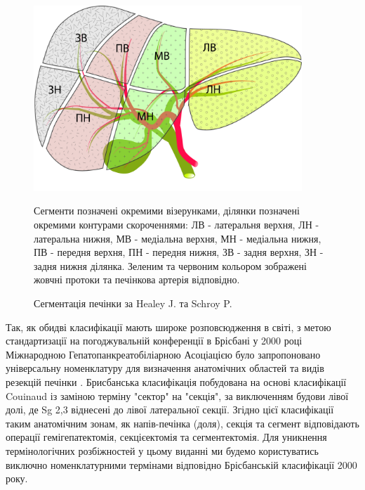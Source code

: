 \begin{figure}[h]
\caption{Сегментація печінки за Healey J. та Schroy P.}

\includegraphics[width=0.9\textwidth]{Illustrations/Chapter_01/Healey.jpg}
\label{fig:Healey}

\medskip
\small
Сегменти позначені окремими візерунками, ділянки позначені окремими контурами скороченнями: ЛВ - латеральня верхня, ЛН - латеральна нижня, МВ - медіальна верхня, МН - медіальна нижня, ПВ - передня верхня, ПН - передня нижня, ЗВ - задня верхня, ЗН - задня нижня ділянка. Зеленим та червоним кольором зображені жовчні протоки та печінкова артерія відповідно.
\end{figure}

Так, як обидві класифікації мають широке розповсюдження в світі, з метою стандартизації на погоджувальній конференції в Брісбані у 2000 році Міжнародною Гепатопанкреатобіліарною Асоціацією було запропоновано універсальну номенклатуру для визначення анатомічних областей та видів резекцій печінки \cite{Pang2000}. Брисбанська класифікація побудована на основі класифікації Couinaud із заміною терміну "сектор" на "секція", за виключенням будови лівої долі, де Sg 2,3 віднесені до лівої латеральної секції. Згідно цієї класифікації таким анатомічним зонам, як напів-печінка (доля), секція та сегмент відповідають операції гемігепатектомія, секцієектомія та сегментектомія. Для уникнення термінологічних розбіжностей у цьому виданні ми будемо користуватись виключно номенклатурними термінами відповідно Брісбанській класифікації 2000 року.

